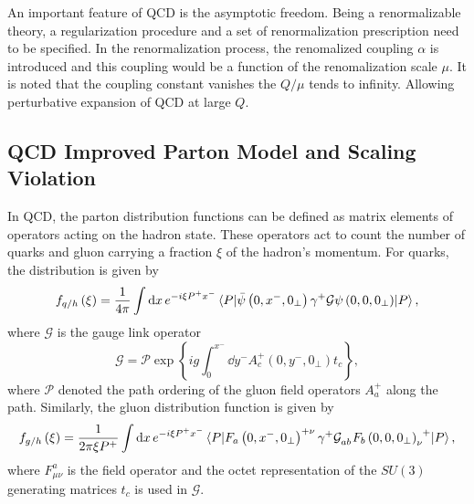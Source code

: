 An important feature of QCD is the asymptotic freedom. Being a renormalizable 
theory, a regularization procedure and a set of renormalization prescription 
need to be specified. In the renormalization process, the renomalized coupling $\alpha$
is introduced and this coupling would be a function of the renomalization scale $\mu$.
It is noted that the coupling constant vanishes the $Q/\mu$ tends to infinity. 
Allowing perturbative expansion of QCD at large $Q$. 


\subsection{QCD Improved Parton Model and Scaling Violation}
\label{subsec:scaling_violation}
In QCD, the parton distribution functions can be defined as matrix elements of 
operators acting on the hadron state. These operators act to count the number of
quarks and gluon carrying a fraction $\xi$ of the hadron's momentum. For quarks,
the distribution is given by\cite{collins1989} 
\begin{equation}
	f_{q/h}\left(\xi\right) = \frac{1}{4\pi}\int \dd{x} e^{-i\xi P^{+} x^{-}} \mel{P}{\bar{\psi}\left(0,x^-,0_\perp\right)\gamma^+ \mathcal{G} \psi\left(0,0,0_\perp\right)}{P},
\end{equation}
where $\mathcal{G}$ is the gauge link operator
\begin{equation}
	\mathcal{G}=\mathcal{P} \exp \left\{ ig\int_0^{x^-}\dd{y^-} A_c^+ \left(0,y^-,0_\perp\right)t_c\right\},
\end{equation}
where $\mathcal{P}$ denoted the path ordering of the gluon field operators $A_a^+$
along the path. Similarly, the gluon distribution function is given by
\begin{equation}
	f_{g/h}\left(\xi\right) = \frac{1}{2\pi\xi P^+}\int \dd{x} e^{-i\xi P^{+} x^{-}} \mel{P}{\tensor{F_a\left(0,x^-,0_\perp\right)}{^+^\nu}\gamma^{+} \tensor{\mathcal{G}}{_a_b} \tensor{F_b\left(0,0,0_\perp\right)}{_\nu^+}}{P},
\end{equation}
where $F^a_{\mu\nu}$ is the field operator and the octet representation of the $SU(3)$
generating matrices $t_c$ is used in $\mathcal{G}$.


